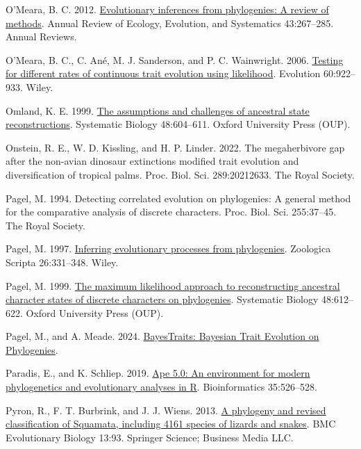 \documentclass{article}
\newlength{\cslhangindent}
\newenvironment{CSLReferences}[2] %
 {\begin{list}{}{%
  \setlength{\itemindent}{0pt}
  \setlength{\leftmargin}{0pt}
  \setlength{\parsep}{0pt}
  \ifodd #1
   \setlength{\leftmargin}{\cslhangindent}
   \setlength{\itemindent}{-1\cslhangindent}
  \fi
  \setlength{\itemsep}{#2\baselineskip}}}
 {\end{list}}
\begin{document}
\begin{CSLReferences}{1}{0}
O'Meara, B. C. 2012. \href{https://doi.org/10.1146/annurev-ecolsys-110411-160331}{Evolutionary inferences from phylogenies: A review of methods}. Annual Review of Ecology, Evolution, and Systematics 43:267--285. Annual Reviews.

O'Meara, B. C., C. Ané, M. J. Sanderson, and P. C. Wainwright. 2006. \href{https://doi.org/10.1111/j.0014-3820.2006.tb01171.x}{Testing for different rates of continuous trait evolution using likelihood}. Evolution 60:922--933. Wiley.

Omland, K. E. 1999. \href{https://doi.org/10.1080/106351599260175}{The assumptions and challenges of ancestral state reconstructions}. Systematic Biology 48:604--611. Oxford University Press (OUP).

Onstein, R. E., W. D. Kissling, and H. P. Linder. 2022. The megaherbivore gap after the non-avian dinosaur extinctions modified trait evolution and diversification of tropical palms. Proc. Biol. Sci. 289:20212633. The Royal Society.

Pagel, M. 1994. Detecting correlated evolution on phylogenies: A general method for the comparative analysis of discrete characters. Proc. Biol. Sci. 255:37--45. The Royal Society.

Pagel, M. 1997. \href{https://doi.org/10.1111/j.1463-6409.1997.tb00423.x}{Inferring evolutionary processes from phylogenies}. Zoologica Scripta 26:331--348. Wiley.

Pagel, M. 1999. \href{https://doi.org/10.1080/106351599260184}{The maximum likelihood approach to reconstructing ancestral character states of discrete characters on phylogenies}. Systematic Biology 48:612--622. Oxford University Press (OUP).

Pagel, M., and A. Meade. 2024. \href{http://www.evolution.rdg.ac.uk/BayesTraits.html}{BayesTraits: {B}ayesian {T}rait {E}volution on {P}hylogenies}.

Paradis, E., and K. Schliep. 2019. \href{https://doi.org/10.1093/bioinformatics/bty633}{Ape 5.0: An environment for modern phylogenetics and evolutionary analyses in {R}}. Bioinformatics 35:526--528.

Pyron, R., F. T. Burbrink, and J. J. Wiens. 2013. \href{https://doi.org/10.1186/1471-2148-13-93}{A phylogeny and revised classification of {S}quamata, including 4161 species of lizards and snakes}. BMC Evolutionary Biology 13:93. Springer Science; Business Media LLC.


\end{CSLReferences}
\end{document}
